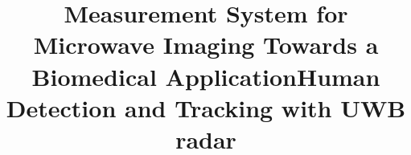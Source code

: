 \documentclass[doctoral,vasteras,idt]{mdhthesis}
\title{Measurement System for Microwave Imaging Towards a Biomedical Application}
\title{Human Detection and Tracking with UWB radar}
\begin{document}

 \blankpages
 
\begin{prefacepart}

\blankpages

 
 \blankpages

 
 \blankpages
% 
 \end{prefacepart}
%
\begin{mainpart}

\newpage
\pagestyle{plain}
\setcounter{page}{1}
\tableofcontents


\newpage


%
%
%
%

%

%
%

%
%

%
%

%
%
%

%
%
%
%
%
\newpage





\end{mainpart}
\end{document}
